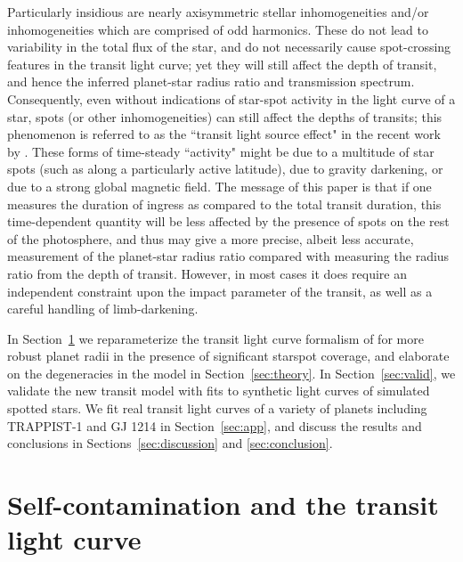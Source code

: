 Particularly insidious are nearly axisymmetric stellar inhomogeneities and/or 
inhomogeneities which are comprised of odd harmonics.  These do not lead
to variability in the total flux of the star, and do not necessarily
cause spot-crossing features in the transit light curve;  yet they will 
still  affect the depth of transit, and hence the inferred planet-star 
radius ratio and transmission spectrum.
Consequently, even without indications of star-spot activity in the light
curve of a star, spots (or other inhomogeneities) can still affect
the depths of transits;  this phenomenon is referred to as the ``transit
light source effect" in the recent work by \citet{Rackham2018}. These forms
of time-steady ``activity" might be
due to a multitude of star spots (such as along a particularly active 
latitude), due to gravity darkening, or due to a strong global magnetic field.
The message of this paper is that if one measures the duration of ingress 
as compared to the total transit
duration, this time-dependent quantity will be less affected by the presence
of spots on the rest of the photosphere, and thus may give a more
precise, albeit less accurate, measurement of the planet-star radius ratio
compared with measuring the radius ratio from the depth of transit.
However, in most cases it does require an independent constraint upon the 
impact parameter of the transit, as well as a careful handling of limb-darkening.

In Section~\ref{sec:rederiving} we reparameterize the transit light curve formalism of \citet{Mandel2002} for more robust planet radii in the presence of significant starspot coverage, and elaborate on the degeneracies in the model in Section~\ref{sec:theory}. In Section~\ref{sec:valid}, we validate the new transit model with fits to synthetic light curves of simulated spotted stars. We fit real transit light curves of a variety of planets including TRAPPIST-1 and GJ 1214 in Section~\ref{sec:app}, and discuss the results and conclusions in Sections~\ref{sec:discussion} and \ref{sec:conclusion}.

\section{Self-contamination and the transit light curve} \label{sec:rederiving}

